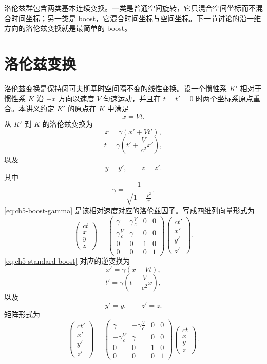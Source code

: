 洛伦兹群包含两类基本连续变换。一类是普通空间旋转，它只混合空间坐标而不混合时间坐标；另一类是 boost，它混合时间坐标与空间坐标。下一节讨论的沿一维方向的洛伦兹变换就是最简单的 boost。

\section{洛伦兹变换}

洛伦兹变换是保持闵可夫斯基时空间隔不变的线性变换。设一个惯性系 $K'$ 相对于惯性系 $K$ 沿 $+x$ 方向以速度 $V$ 匀速运动，并且在 $t=t'=0$ 时两个坐标系原点重合。本讲义约定 $K'$ 的原点在 $K$ 中满足
\[
x=Vt.
\]
从 $K'$ 到 $K$ 的洛伦兹变换为
\[
x=\gamma(x'+Vt'),
\]
\[
t=\gamma\left(t'+\frac{V}{c^{2}}x'\right),
\]
以及
\[
y=y',\qquad z=z'.
\]
其中
\begin{equation}
\label{eq:ch5-boost-gamma}
\gamma=\frac{1}{\sqrt{1-\frac{V^{2}}{c^{2}}}}.
\end{equation}
\eqref{eq:ch5-boost-gamma} 是该相对速度对应的洛伦兹因子。写成四维列向量形式为
\begin{equation}
\label{eq:ch5-standard-boost}
\begin{pmatrix}
	ct\\x\\y\\z
\end{pmatrix}
=
\begin{pmatrix}
	\gamma & \gamma\frac{V}{c} & 0 & 0\\
	\gamma\frac{V}{c} & \gamma & 0 & 0\\
	0&0&1&0\\
	0&0&0&1
\end{pmatrix}
\begin{pmatrix}
	ct'\\x'\\y'\\z'
\end{pmatrix}.
\end{equation}
\eqref{eq:ch5-standard-boost} 对应的逆变换为
\[
x'=\gamma(x-Vt),
\]
\[
t'=\gamma\left(t-\frac{V}{c^{2}}x\right),
\]
以及
\[
y'=y,
\qquad
z'=z.
\]
矩阵形式为
\begin{equation}
\label{eq:ch5-inverse-boost}
\begin{pmatrix}
	ct'\\x'\\y'\\z'
\end{pmatrix}
=
\begin{pmatrix}
	\gamma & -\gamma\frac{V}{c} & 0 & 0\\
	-\gamma\frac{V}{c} & \gamma & 0 & 0\\
	0&0&1&0\\
	0&0&0&1
\end{pmatrix}
\begin{pmatrix}
	ct\\x\\y\\z
\end{pmatrix}.
\end{equation}
